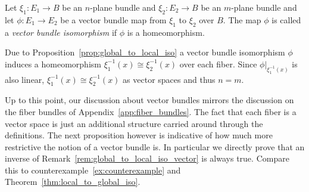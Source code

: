 \begin{definition} Let $\xi_1:E_1\to B$ be an $n$-plane bundle and $\xi_2:E_2\to B$ be an $m$-plane bundle and let $\phi:E_1\to E_2$ be a vector bundle map from $\xi_1$ to $\xi_2$ over $B$. The map $\phi$ is called a \emph{vector bundle isomorphism} if $\phi$ is a homeomorphism.
\end{definition}
\begin{remark}\label{rem:global_to_local_iso_vector} Due to Proposition~\ref{prop:global_to_local_iso} a vector bundle isomorphism $\phi$ induces a homeomorphism $\xi_1^{-1}(x)\cong\xi_2^{-1}(x)$ over each fiber. Since $\phi|_{\xi_1^{-1}(x)}$ is also linear, $\xi_1^{-1}(x)\cong\xi_2^{-1}(x)$ as vector spaces and thus $n=m$.
\end{remark}

Up to this point, our discussion about vector bundles mirrors the discussion on the fiber bundles of Appendix~\ref{app:fiber_bundles}. The fact that each fiber is a vector space is just an additional structure carried around through the definitions. The next proposition however is indicative of how much more restrictive the notion of a vector bundle is. In particular we directly prove that an inverse of Remark~\ref{rem:global_to_local_iso_vector} is always true. Compare this to counterexample~\ref{ex:counterexample} and Theorem~\ref{thm:local_to_global_iso}.

